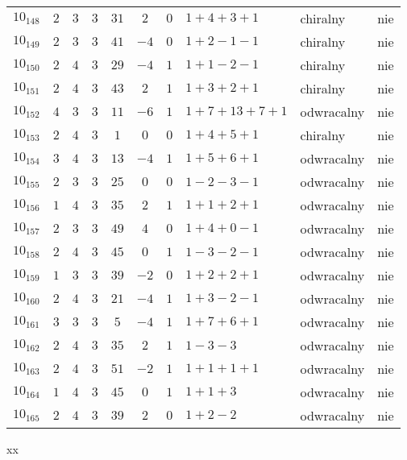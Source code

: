 \begin{longtable}{lccccccllc}
$10_{148}$  &  $2$     &  $3$  &  $3$      &  $31$   &  $2$   &  $0$  &  $1+4+3+1$      &  chiralny    &  nie  \\
$10_{149}$  &  $2$     &  $3$  &  $3$      &  $41$   &  $-4$  &  $0$  &  $1+2-1-1$      &  chiralny    &  nie  \\
$10_{150}$  &  $2$     &  $4$  &  $3$      &  $29$   &  $-4$  &  $1$  &  $1+1-2-1$      &  chiralny    &  nie  \\
$10_{151}$  &  $2$     &  $4$  &  $3$      &  $43$   &  $2$   &  $1$  &  $1+3+2+1$      &  chiralny    &  nie  \\
$10_{152}$  &  $4$     &  $3$  &  $3$      &  $11$   &  $-6$  &  $1$  &  $1+7+13+7+1$   &  odwracalny  &  nie  \\
$10_{153}$  &  $2$     &  $4$  &  $3$      &  $1$    &  $0$   &  $0$  &  $1+4+5+1$      &  chiralny    &  nie  \\
$10_{154}$  &  $3$     &  $4$  &  $3$      &  $13$   &  $-4$  &  $1$  &  $1+5+6+1$      &  odwracalny  &  nie  \\
$10_{155}$  &  $2$     &  $3$  &  $3$      &  $25$   &  $0$   &  $0$  &  $1-2-3-1$      &  odwracalny  &  nie  \\
$10_{156}$  &  $1$     &  $4$  &  $3$      &  $35$   &  $2$   &  $1$  &  $1+1+2+1$      &  odwracalny  &  nie  \\
$10_{157}$  &  $2$     &  $3$  &  $3$      &  $49$   &  $4$   &  $0$  &  $1+4+0-1$      &  odwracalny  &  nie  \\
$10_{158}$  &  $2$     &  $4$  &  $3$      &  $45$   &  $0$   &  $1$  &  $1-3-2-1$      &  odwracalny  &  nie  \\
$10_{159}$  &  $1$     &  $3$  &  $3$      &  $39$   &  $-2$  &  $0$  &  $1+2+2+1$      &  odwracalny  &  nie  \\
$10_{160}$  &  $2$     &  $4$  &  $3$      &  $21$   &  $-4$  &  $1$  &  $1+3-2-1$      &  odwracalny  &  nie  \\
$10_{161}$  &  $3$     &  $3$  &  $3$      &  $5$    &  $-4$  &  $1$  &  $1+7+6+1$      &  odwracalny  &  nie  \\
$10_{162}$  &  $2$     &  $4$  &  $3$      &  $35$   &  $2$   &  $1$  &  $1-3-3$        &  odwracalny  &  nie  \\
$10_{163}$  &  $2$     &  $4$  &  $3$      &  $51$   &  $-2$  &  $1$  &  $1+1+1+1$      &  odwracalny  &  nie  \\
$10_{164}$  &  $1$     &  $4$  &  $3$      &  $45$   &  $0$   &  $1$  &  $1+1+3$        &  odwracalny  &  nie  \\
$10_{165}$  &  $2$     &  $4$  &  $3$      &  $39$   &  $2$   &  $0$  &  $1+2-2$        &  odwracalny  &  nie  \\
\hline
\end{longtable}
\normalsize

xx

